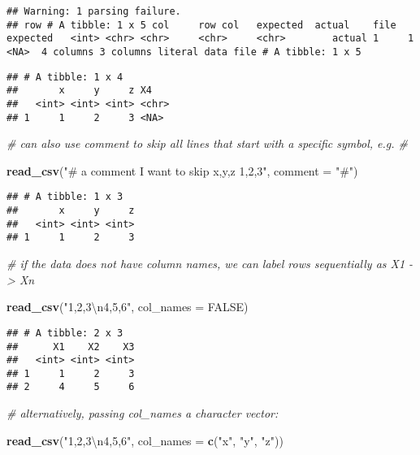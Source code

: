 \documentclass[]{article}
\newenvironment{Shaded}{\begin{snugshade}}{\end{snugshade}}
\newcommand{\KeywordTok}[1]{\textcolor[rgb]{0.13,0.29,0.53}{\textbf{#1}}}
\newcommand{\DataTypeTok}[1]{\textcolor[rgb]{0.13,0.29,0.53}{#1}}
\newcommand{\CharTok}[1]{\textcolor[rgb]{0.31,0.60,0.02}{#1}}
\newcommand{\StringTok}[1]{\textcolor[rgb]{0.31,0.60,0.02}{#1}}
\newcommand{\CommentTok}[1]{\textcolor[rgb]{0.56,0.35,0.01}{\textit{#1}}}
\newcommand{\OtherTok}[1]{\textcolor[rgb]{0.56,0.35,0.01}{#1}}
\newcommand{\NormalTok}[1]{#1}
\begin{document}
\begin{verbatim}
## Warning: 1 parsing failure.
## row # A tibble: 1 x 5 col     row col   expected  actual    file         expected   <int> <chr> <chr>     <chr>     <chr>        actual 1     1 <NA>  4 columns 3 columns literal data file # A tibble: 1 x 5
\end{verbatim}

\begin{verbatim}
## # A tibble: 1 x 4
##       x     y     z X4   
##   <int> <int> <int> <chr>
## 1     1     2     3 <NA>
\end{verbatim}

\begin{Shaded}
\begin{Highlighting}[]
\CommentTok{# can also use comment to skip all lines that start with a specific symbol, e.g. #}

\KeywordTok{read_csv}\NormalTok{(}\StringTok{"# a comment I want to skip}
\StringTok{         x,y,z}
\StringTok{         1,2,3"}\NormalTok{, }
         \DataTypeTok{comment =} \StringTok{"#"}\NormalTok{)}
\end{Highlighting}
\end{Shaded}

\begin{verbatim}
## # A tibble: 1 x 3
##       x     y     z
##   <int> <int> <int>
## 1     1     2     3
\end{verbatim}

\begin{Shaded}
\begin{Highlighting}[]
\CommentTok{# if the data does not have column names, we can label rows sequentially as X1 -> Xn}

\KeywordTok{read_csv}\NormalTok{(}\StringTok{"1,2,3}\CharTok{\textbackslash{}n}\StringTok{4,5,6"}\NormalTok{, }\DataTypeTok{col_names =} \OtherTok{FALSE}\NormalTok{)}
\end{Highlighting}
\end{Shaded}

\begin{verbatim}
## # A tibble: 2 x 3
##      X1    X2    X3
##   <int> <int> <int>
## 1     1     2     3
## 2     4     5     6
\end{verbatim}

\begin{Shaded}
\begin{Highlighting}[]
\CommentTok{# alternatively, passing col_names a character vector: }

\KeywordTok{read_csv}\NormalTok{(}\StringTok{"1,2,3}\CharTok{\textbackslash{}n}\StringTok{4,5,6"}\NormalTok{, }\DataTypeTok{col_names =} \KeywordTok{c}\NormalTok{(}\StringTok{"x"}\NormalTok{, }\StringTok{"y"}\NormalTok{, }\StringTok{"z"}\NormalTok{))}
\end{Highlighting}
\end{Shaded}
\end{document}
